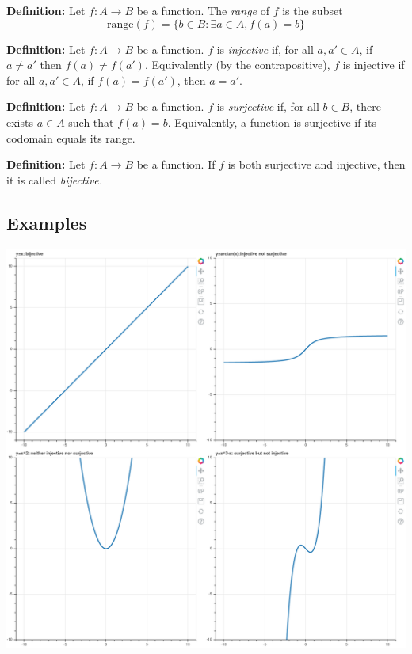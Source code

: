 \documentclass[
]{article}
\begin{document}
\textbf{Definition:} Let \(f:A\to B\) be a function. The \emph{range} of
\(f\) is the subset
\[\mathrm{range}(f)=\{b\in B: \exists a\in A, f(a)=b\}\]

\textbf{Definition:} Let \(f:A\to B\) be a function. \(f\) is
\emph{injective} if, for all \(a,a'\in A\), if \(a\not=a'\) then
\(f(a)\not=f(a')\). Equivalently (by the contrapositive), \(f\) is
injective if for all \(a,a'\in A\), if \(f(a)=f(a')\), then \(a=a'\).

\textbf{Definition:} Let \(f:A\to B\) be a function. \(f\) is
\emph{surjective} if, for all \(b\in B\), there exists \(a\in A\) such
that \(f(a)=b\). Equivalently, a function is surjective if its codomain
equals its range.

\textbf{Definition:} Let \(f:A\to B\) be a function. If \(f\) is both
surjective and injective, then it is called \emph{bijective.}

\vfill\eject

\hypertarget{examples}{%
\subsection{Examples}\label{examples}}

\includegraphics[width=1\textwidth,height=\textheight]{../png/injsurjbijexamples.png}

\vfill
\end{document}
